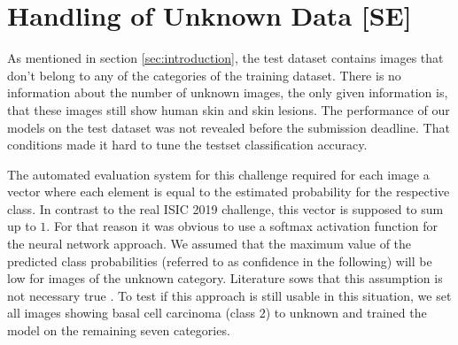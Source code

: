
\section{Handling of Unknown Data [SE]}\label{sec:unknown_data}

As mentioned in section \ref{sec:introduction}, the test dataset contains images that don't belong to any of the categories of the training dataset. There is no information about the number of unknown images, the only given information is, that these images still show human skin and skin lesions. The performance of our models on the test dataset was not revealed before the submission deadline. That conditions made it hard to tune the testset classification accuracy. 

The automated evaluation system for this challenge required for each image a vector where each element is equal to the estimated probability for the respective class. In contrast to the real ISIC 2019 challenge, this vector is supposed to sum up to $1$. For that reason it was obvious to use a softmax activation function for the neural network approach. We assumed that the maximum value of the predicted class probabilities (referred to as confidence in the following) will be low for images of the unknown category. Literature sows that this assumption is not necessary true \cite{softmax_conf}. To test if this approach is still usable in this situation, we set all images showing basal cell carcinoma (class $2$) to unknown and trained the model on the remaining seven categories. 

